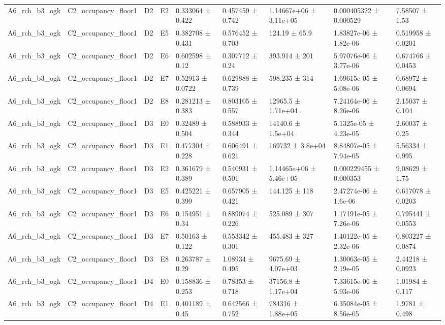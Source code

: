 \begin{table}
\begin{tabular}{lllllllll}
A6\_rch\_b3\_ogk & C2\_occupancy\_floor1 & D2 & E2 & 0.333064 ± 0.422 & 0.457459 ± 0.742 & 1.14667e+06 ± 3.11e+05 & 0.000405322 ± 0.000529 & 7.58507 ± 1.53 \\
A6\_rch\_b3\_ogk & C2\_occupancy\_floor1 & D2 & E5 & 0.382708 ± 0.431 & 0.576452 ± 0.703 & 124.19 ± 65.9 & 1.83827e-06 ± 1.82e-06 & 0.519958 ± 0.0201 \\
A6\_rch\_b3\_ogk & C2\_occupancy\_floor1 & D2 & E6 & 0.602598 ± 0.12 & 0.307712 ± 0.24 & 393.914 ± 201 & 5.97076e-06 ± 3.77e-06 & 0.674766 ± 0.0453 \\
A6\_rch\_b3\_ogk & C2\_occupancy\_floor1 & D2 & E7 & 0.52913 ± 0.0722 & 0.629888 ± 0.739 & 598.235 ± 314 & 1.69615e-05 ± 5.08e-06 & 0.68972 ± 0.0694 \\
A6\_rch\_b3\_ogk & C2\_occupancy\_floor1 & D2 & E8 & 0.281213 ± 0.383 & 0.803105 ± 0.557 & 12965.5 ± 1.71e+04 & 7.24164e-06 ± 8.26e-06 & 2.15037 ± 0.104 \\
A6\_rch\_b3\_ogk & C2\_occupancy\_floor1 & D3 & E0 & 0.32489 ± 0.504 & 0.588933 ± 0.344 & 14140.6 ± 1.5e+04 & 5.1325e-05 ± 4.23e-05 & 2.60037 ± 0.25 \\
A6\_rch\_b3\_ogk & C2\_occupancy\_floor1 & D3 & E1 & 0.477304 ± 0.228 & 0.606491 ± 0.621 & 169732 ± 3.8e+04 & 8.84807e-05 ± 7.94e-05 & 5.56334 ± 0.995 \\
A6\_rch\_b3\_ogk & C2\_occupancy\_floor1 & D3 & E2 & 0.361679 ± 0.389 & 0.540931 ± 0.501 & 1.14465e+06 ± 5.46e+05 & 0.000229455 ± 0.000353 & 9.08629 ± 1.75 \\
A6\_rch\_b3\_ogk & C2\_occupancy\_floor1 & D3 & E5 & 0.425221 ± 0.399 & 0.657905 ± 0.421 & 144.125 ± 118 & 2.47274e-06 ± 1.6e-06 & 0.617078 ± 0.0203 \\
A6\_rch\_b3\_ogk & C2\_occupancy\_floor1 & D3 & E6 & 0.154951 ± 0.34 & 0.889074 ± 0.226 & 525.089 ± 307 & 1.17191e-05 ± 7.26e-06 & 0.795441 ± 0.0553 \\
A6\_rch\_b3\_ogk & C2\_occupancy\_floor1 & D3 & E7 & 0.50163 ± 0.122 & 0.553342 ± 0.301 & 455.483 ± 327 & 1.40122e-05 ± 2.32e-06 & 0.803227 ± 0.0874 \\
A6\_rch\_b3\_ogk & C2\_occupancy\_floor1 & D3 & E8 & 0.263787 ± 0.29 & 1.08934 ± 0.495 & 9675.69 ± 4.07e+03 & 1.30063e-05 ± 2.19e-05 & 2.44218 ± 0.0923 \\
A6\_rch\_b3\_ogk & C2\_occupancy\_floor1 & D4 & E0 & 0.158836 ± 0.253 & 0.78353 ± 0.718 & 37156.8 ± 1.17e+04 & 7.33615e-06 ± 5.93e-06 & 1.01984 ± 0.117 \\
A6\_rch\_b3\_ogk & C2\_occupancy\_floor1 & D4 & E1 & 0.401189 ± 0.45 & 0.642566 ± 0.752 & 784316 ± 1.88e+05 & 6.35084e-05 ± 8.56e-05 & 1.9781 ± 0.498 \\

\end{tabular}
\end{table}
